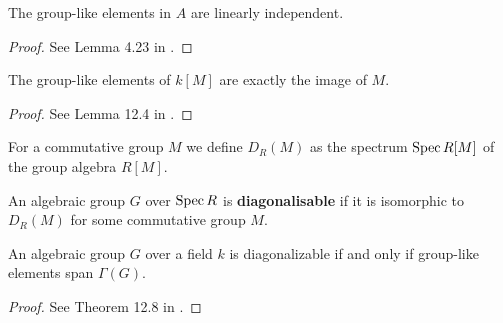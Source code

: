 \begin{lemma}
  \label{0-grp-like-lin-indep}
  \leanok

  The group-like elements in $A$ are linearly independent.
\end{lemma}
\begin{proof}
  \leanok

  See Lemma 4.23 in \cite{Milne_2017}.
\end{proof}


\begin{lemma}
  \label{0-grp-like-grp-alg}
  \leanok

  The group-like elements of $k[M]$ are exactly the image of $M$.
\end{lemma}
\begin{proof}
  \leanok

  See Lemma 12.4 in \cite{Milne_2017}.
\end{proof}


\begin{definition}
  \label{0-spec-grp-alg}
  \leanok

  For a commutative group $M$ we define $D_R(M)$ as the spectrum $\operatorname{Spec} R[M]$ of the group algebra $R[M]$.
\end{definition}


\begin{definition}
  \label{0-diag}

  An algebraic group $G$ over $\operatorname{Spec} R$ is {\bf diagonalisable}
  if it is isomorphic to $D_R(M)$ for some commutative group $M$.
\end{definition}


\begin{theorem}
  \label{0-diag-iff-grp-like-span}
  \leanok

  An algebraic group $G$ over a field $k$ is diagonalizable if and only if group-like elements span $\Gamma(G)$.
\end{theorem}
\begin{proof}

  See Theorem 12.8 in \cite{Milne_2017}.
\end{proof}


